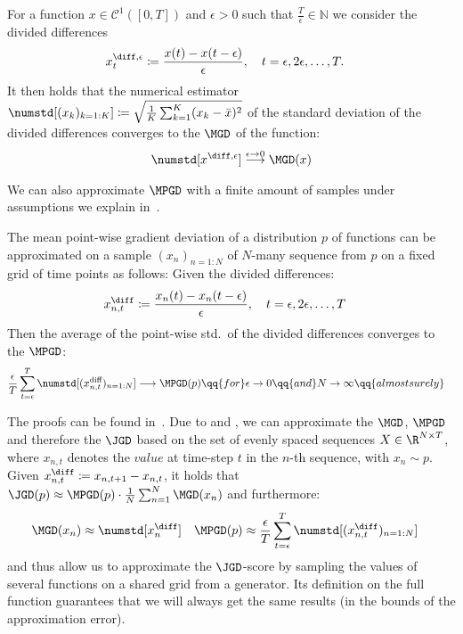 \begin{lemma}\label{lemma:approx-tvl}
For a function $x \in \mathcal{C}^{1}([0,T])$ and $\epsilon > 0$ such that
$\frac{T}{\epsilon} \in \mathbb{N}$ we consider the divided differences
%
\begin{align*}
	x^{\diff,\epsilon}_t
	&\coloneqq \frac{x(t) - x(t-\epsilon)}{\epsilon}
	,\quad t=\epsilon,2\epsilon,\ldots,T.
\end{align*}
%
It then holds that the numerical estimator ${\numstd[(x_k)_{k=1:K}] \coloneqq \sqrt{\frac{1}{K}\sum_{k=1}^{K} (x_k - \bar{x})^2 }}$ of the standard deviation of the divided differences converges to the $\MGD$ of the function:
%
\begin{align}\label{eq:mgd_convergence}
	\numstd[x^{\diff,\epsilon}] \overset{\epsilon \to 0}{\longrightarrow} \MGD(x)
\end{align}
\end{lemma}

We can also approximate $\MPGD$ with a finite amount of samples under assumptions we explain in~.
%
\begin{lemma}\label{lemma:approx-atv}
The mean point-wise gradient deviation of a distribution $p$ of
functions can be approximated on a sample $(x_n)_{n=1:N}$ of $N$-many sequence from $p$ on a fixed grid of time points as follows: Given the divided differences:
%
\begin{align*}
	x^{\diff}_{n,t} & \coloneqq \frac{x_n(t) - x_n(t-\epsilon)}{\epsilon},\quad t=\epsilon,2\epsilon,\ldots,T
\end{align*}
%
Then the average of the point-wise std.\ of the divided differences converges to the $\MPGD$:
%
\begin{align}\label{eq:mpgd-approx}
\frac{\epsilon}{T}\sum_{t=\epsilon}^T \numstd[(x^{\text{diff}}_{n,t})_{n=1:N}]
	&\longrightarrow \MPGD(p)
	\qq{for} \epsilon\to 0 \qq{and} N\to\infty \qq{almost surely}
\end{align}
\end{lemma}
%
The proofs can be found in~. Due to  and ,
we can approximate the $\MGD$, $\MPGD$ and therefore the $\JGD$ based on the set of evenly spaced sequences ${X \in \R^{N \times T}}$, where $x_{n,t}$ denotes the $value$ at time-step $t$ in the $n$-th sequence, with $x_n \sim p$.
Given ${x^{\diff}_{n,t} \coloneqq  x_{n, t+1} - x_{n,t}}$,
it holds that ${\JGD(p) \approx  \MPGD(p) \cdot \frac{1}{N}\sum_{n=1}^{N} \MGD(x_n)}$ and furthermore:
%
\begin{align}\label{eq:jgd-approx}
	\MGD(x_n) &\approx \numstd[x^{\diff}_n]
&	\MPGD(p)  &\approx \frac{\epsilon}{T}\sum_{t=\epsilon}^{T}
	\numstd[(x^{\diff}_{n,t})_{n=1:N}]
\end{align}
%
 and  thus allow us to approximate the $\JGD$-score by sampling the values of several functions on a shared grid from a generator.
Its definition on the full function guarantees that we will always get the same results (in the bounds of the approximation error).

